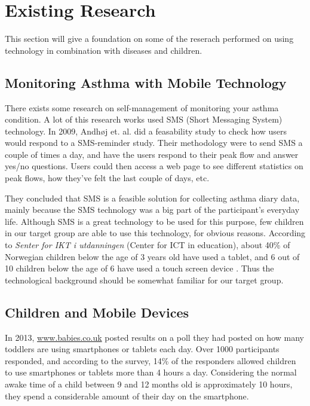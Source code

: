 \section{Existing Research}
\label{sec:existing-research}

This section will give a foundation on some of the reserach performed on using technology in combination with diseases and children. 


\subsection{Monitoring Asthma with Mobile Technology}
There exists some research on self-management of monitoring your asthma condition. A lot of this research works used SMS (Short Messaging System) technology. In 2009, Andh\o j  et. al.\cite{anhoj2004feasibility} did a feasability study to check how users would respond to a SMS-reminder study. Their methodology were to send SMS a couple of times a day, and have the users respond to their peak flow and answer yes/no questions. Users could then access a web page to see different statistics on peak flows, how they've felt the last couple of days, etc.

They concluded that SMS is a feasible solution for collecting asthma diary data, mainly because the SMS technology was a big part of the participant's everyday life. Although SMS is a great technology to be used for this purpose, few children in our target group are able to use this technology, for obvious reasons. According to \emph{Senter for IKT i utdanningen} (Center for ICT in education), about 40\% of Norwegian children below the age of 3 years old have used a tablet, and 6 out of 10 children below the age of 6 have used a touch screen device \cite{nrkchilduse}. Thus the technological background should be somewhat familiar for our target group.  


\subsection{Children and Mobile Devices}
In 2013, \url{www.babies.co.uk} posted results on a poll they had posted on how many toddlers are using smartphones or tablets each day\cite{babiesusageoftablets}. Over 1000 participants responded,  and according to the survey, 14\% of the responders allowed children to use smartphones or tablets more than 4 hours a day. Considering the normal awake time of a child between 9 and 12 months old is approximately 10 hours, they spend a considerable amount of their day on the smartphone.         


